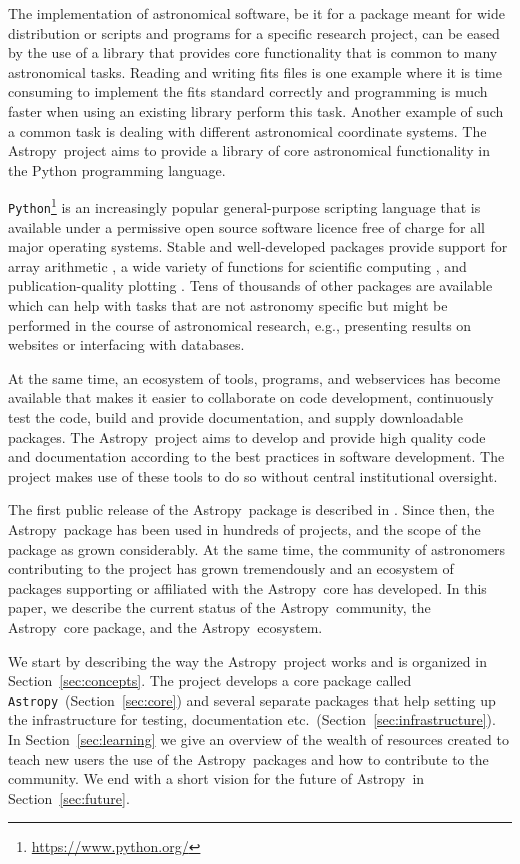 \documentclass[modern]{aastex61}
\newcommand{\package}[1]{\texttt{#1}}
\newcommand{\python}{\package{Python}}
\newcommand{\astropy}{Astropy}
\newcommand{\astropypkg}{\package{Astropy}}
\newcommand{\sectionname}{Section}
\begin{document}
The implementation of astronomical software, be it for a package meant
for wide distribution or scripts and programs for a specific research
project, can be eased by the use of a library that provides core
functionality that is common to many astronomical tasks. Reading and
writing fits files is one example where it is time
consuming to implement the fits standard correctly and
programming is much faster when using an existing library perform this
task. Another example of such a common task is dealing with different
astronomical coordinate systems. The \astropy\ project aims to provide a
library of core astronomical functionality in the Python programming
language.

\python\footnote{\url{https://www.python.org/}} is an increasingly popular
general-purpose scripting language that is available under a permissive open
source software licence free of charge for all major operating systems. Stable
and well-developed packages provide support for array arithmetic
\citep[\package{numpy},][]{numpy}, a wide variety of functions for scientific
computing \citep[\package{scipy},][]{numpy}, and publication-quality plotting
\citep[\package{matplotlib},][]{matplotlib}. Tens of thousands of other packages
are available which can help with tasks that are not astronomy specific but
might be performed in the course of astronomical research, e.g., presenting
results on websites or interfacing with databases.

At the same time, an ecosystem of tools, programs, and webservices
has become available that makes it easier to collaborate on code development,
continuously test the code, build and provide documentation, and
supply downloadable packages. The \astropy\ project aims to develop and
provide high quality code and documentation according to the best
practices in software development. The project makes use of these
tools to do so without central institutional oversight.

The first public release of the \astropy\ package is described in
\cite{astropy}. Since then, the \astropy\ package has been
used in hundreds of projects, and the scope of the package as grown
considerably. At the same time, the community of astronomers
contributing to the project has grown tremendously and an ecosystem
of packages supporting or affiliated with the \astropy\ core has
developed. In this paper, we describe the current status of the
\astropy\ community, the \astropy\ core package, and the \astropy\
ecosystem.

We start by describing the way the \astropy\ project works and is
organized in \sectionname~\ref{sec:concepts}.  The project develops a core
package called \astropypkg\ (\sectionname~\ref{sec:core}) and several
separate packages that help setting up the infrastructure for testing,
documentation etc.\ (\sectionname~\ref{sec:infrastructure}). In
\sectionname~\ref{sec:learning} we give an overview of the wealth of
resources created to teach new users the use of the \astropy\ packages
and how to contribute to the community. We end with a short vision for
the future of \astropy\ in \sectionname~\ref{sec:future}.
\end{document}
